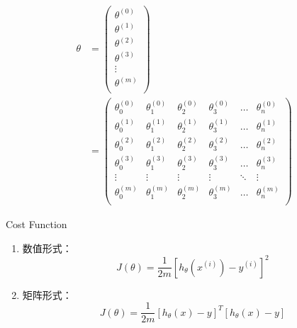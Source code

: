 \begin{equation} \begin{aligned}
	\theta & = \left(\begin{matrix}
			\theta^{(0)} \\ \theta^{(1)} \\ \theta^{(2)} \\ \theta^{(3)} \\ \vdots \\ \theta^{(m)} \\
		\end{matrix}\right) \\
	& = \left(\begin{matrix}
			\theta_0^{(0)} & \theta_1^{(0)} & \theta_2^{(0)} & \theta_3^{(0)} & \dots & \theta_n^{(0)} \\
			\theta_0^{(1)} & \theta_1^{(1)} & \theta_2^{(1)} & \theta_3^{(1)} & \dots & \theta_n^{(1)} \\
			\theta_0^{(2)} & \theta_1^{(2)} & \theta_2^{(2)} & \theta_3^{(2)} & \dots & \theta_n^{(2)} \\
			\theta_0^{(3)} & \theta_1^{(3)} & \theta_2^{(3)} & \theta_3^{(3)} & \dots & \theta_n^{(3)} \\
			\vdots    & \vdots    & \vdots    & \vdots    & \ddots & \vdots   \\
			\theta_0^{(m)} & \theta_1^{(m)} & \theta_2^{(m)} & \theta_3^{(m)} & \dots & \theta_n^{(m)} \\
			\end{matrix}\right)
\end{aligned}\end{equation}

Cost Function
\begin{enumerate}
\item 数值形式：
\begin{equation}
	J(\theta) = \frac{1}{2m} \left[ h_\theta(x^{(i)}) - y^{(i)}\right]^2
\end{equation}

\item 矩阵形式：
\begin{equation}
	J(\theta) = \frac{1}{2m} \left[h_\theta(x) - y\right]^T \left[ h_\theta(x) - y\right]
\end{equation}
\end{enumerate}

